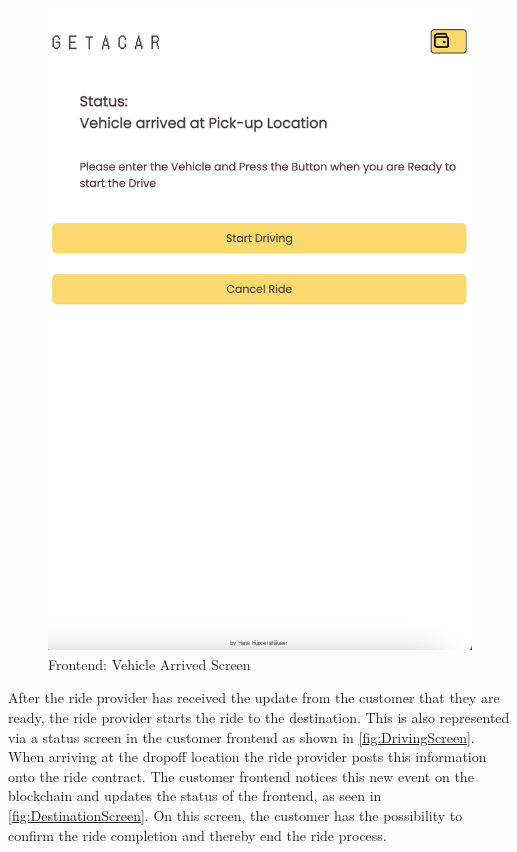 \begin{figure}[H]
    \hfill
    \begin{minipage}{0.45\linewidth}
        \centering
        \includegraphics[width=\linewidth]{data/ffss/8.png}
        \caption{Frontend: Vehicle Arrived Screen}
        \label{fig:VehicleArrivedScreen}
    \end{minipage}
    
\end{figure}

After the ride provider has received the update from the customer that they are ready, the ride provider starts the ride to the destination. This is also represented via a status screen in the customer frontend as shown in \ref{fig:DrivingScreen}. When arriving at the dropoff location the ride provider posts this information onto the ride contract. The customer frontend notices this new event on the blockchain and updates the status of the frontend, as seen in \ref{fig:DestinationScreen}. On this screen, the customer has the possibility to confirm the ride completion and thereby end the ride process.


